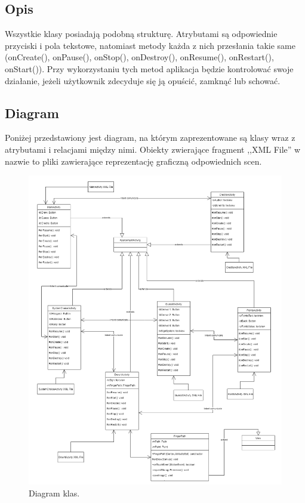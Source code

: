 \documentclass[15pt]{article}
\begin{document}
  \subsection{Opis}
  Wszystkie klasy posiadają podobną strukturę. Atrybutami są odpowiednie przyciski i pola tekstowe, natomiast metody każda z nich przesłania takie same (onCreate(), onPause(), onStop(), onDestroy(), onResume(), onRestart(), onStart()). Przy wykorzystaniu tych metod aplikacja będzie kontrolować swoje działanie, jeżeli użytkownik zdecyduje się ją opuścić, zamknąć lub schować.
 
  \subsection{Diagram}
  Poniżej przedstawiony jest diagram, na którym zaprezentowane są klasy wraz z atrybutami i relacjami między nimi. Obiekty zwierające fragment ,,XML File'' w nazwie to pliki zawierające reprezentację graficzną odpowiednich scen.
  \begin{figure}
    \includegraphics[width=\linewidth]{diagram}
    \caption{Diagram klas.}
    \label{fig:diagram}
  \end{figure}
\end{document}
